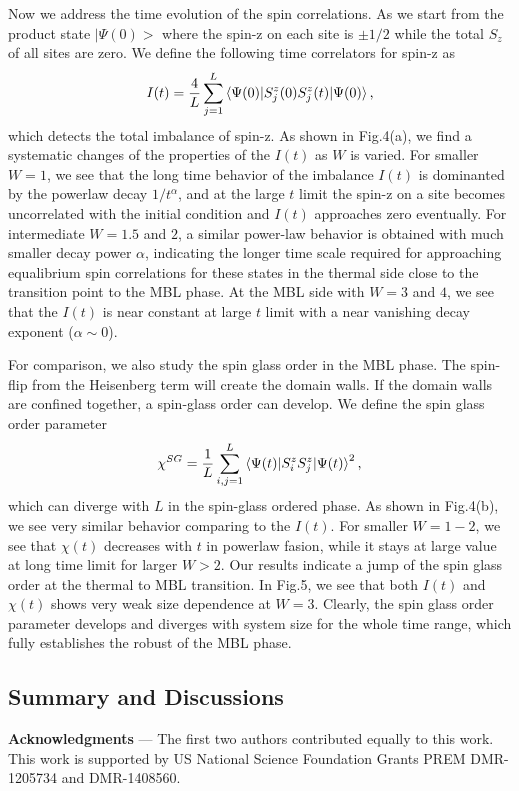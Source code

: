 \documentclass[prl,aps,epsf,showpacs,twocolumn,letterpaper]{revtex4}
\begin{document}
Now we address the time evolution of the spin correlations.  As we start from
the product state $|\Psi(0)>$ where the spin-z on each site is  $\pm 1/2$  while
the total $S_z$ of all sites are zero. We define the following time correlators
for spin-z  as 
\begin{equation}
  I(t)=\frac{4}{L} \sum_{j=1}^L \braket{\Psi(0)|S_j^z(0)S_j^z(t)|\Psi(0)}
  \text{,} \label{eq:imb}
\end{equation}
which detects the  total imbalance of
spin-z. As shown in Fig.4(a),  we find a systematic changes of the properties of
the $I(t)$ as $W$ is varied.   For smaller $W=1$,  we see that the long time
behavior of the imbalance $I(t)$ is dominanted by the powerlaw decay
$1/t^{\alpha}$, and at the large $t$ limit  the spin-z on a site becomes
uncorrelated with the initial condition and $I(t)$ approaches zero eventually.
For intermediate $W=1.5$ and $2$,  a similar power-law behavior is obtained with
much smaller decay power $\alpha$, indicating the longer time scale required for
approaching equalibrium spin correlations for these states in the thermal side
close to the transition point to the MBL phase.  At the MBL side with $W=3$ and
$4$,  we see that the $I(t)$ is near constant at large $t$ limit with a near
vanishing decay exponent ($\alpha \sim 0$).

For comparison,  we also study the spin glass order  in the MBL phase.  The
spin-flip  from the Heisenberg term will create the domain walls.  If the
domain walls  are confined together, a spin-glass order can develop.  We define
the spin glass order parameter 
\begin{equation}
  \chi^{SG}=\frac 1 L \sum_{i,j=1}^L \braket{\Psi(t)|S_i^zS_j^z|\Psi(t)}^2
  \text{,} \label{eq:sgo}
\end{equation}
which can diverge with $L$ in the spin-glass
ordered phase.  As shown in Fig.4(b), we see very  similar behavior comparing to
the $I(t)$.  For smaller $W=1-2$,  we see that $\chi(t)$ decreases with $t$ in
powerlaw fasion, while it stays at large value at long time limit for larger
$W>2$.  Our  results indicate a jump of the spin glass order at the thermal to
MBL transition.  In Fig.5,  we see that both $I(t)$ and $\chi(t)$ shows very
weak size dependence at $W=3$.   Clearly, the spin glass order parameter
develops and diverges with system size for the whole time range, which  fully
establishes the robust of the MBL phase.  



\subsection{Summary and Discussions}



                                 

{\bf Acknowledgments} --- The first two authors contributed equally to this
work.  This work is supported by US National Science Foundation  Grants PREM
DMR-1205734 and DMR-1408560.




 
\end{document}

